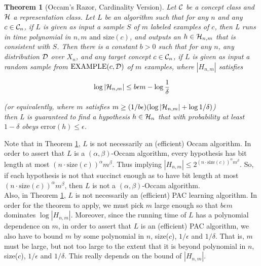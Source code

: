 \documentclass[12pt]{article}
\newtheorem{theorem}{Theorem}
\newcommand{\calc}{{\cal C}}
\newcommand{\cald}{{\cal D}}
\newcommand{\calh}{{\cal H}}
\begin{document}
\begin{theorem} [Occam's Razor, Cardinality Version] \label{theorem:occ-cad}
Let $\calc$ be a concept class and $\calh$ a representation class. Let $L$ be an algorithm such that for any $n$ and any $c \in \calc_n$, if $L$ is given as input a sample $S$ of $m$ labeled examples of $c$, then L runs in time polynomial in $n, m \text{ and size}(c)$, and outputs an $h \in \calh_{n,m}$ that is consistent with $S$. Then there is a constant $b > 0$ such that for any $n$, any distribution $\cald$ over $X_n$, and any target concept $c \in \calc_n$, if $L$ is given as input a random sample from $\text{EXAMPLE}(c, \cald)$ of $m$ examples, where $|H_{n,m}|$ satisfies

\begin{equation*}
\log {|\calh_{n,m}|} \le b \epsilon m - \log {\frac {1}{\delta}}
\end{equation*}

(or equivalently, where $m$ satisfies $m \ge (1 / {b \epsilon}) (\log {|\calh_{n,m}| + \log {1 / \delta}})$) \\
then L is guaranteed to find a hypothesis $h \in \calh_n$ that with probability at least $1 - \delta$ obeys $\text {error}(h) \le \epsilon$.
\end{theorem}

Note that in Theorem \ref{theorem:occ-cad}, $L$ is not necessarily an (efficient) Occam algorithm. In order to assert that $L$ is a $(\alpha, \beta)$-Occam algorithm, every hypothesis has bit length at most $(n \cdot \text {size}(c))^{\alpha}m^{\beta}$. Thus implying $|H_{n,m}| \le 2^{(n \cdot \text {size}(c))^{\alpha}m^{\beta}}$. So, if each hypothesis is not that succinct enough as to have bit length at most $(n \cdot \text {size}(c))^{\alpha}m^{\beta}$, then $L$ is not a $(\alpha, \beta)$-Occam algorithm. \\

Also, in Theorem \ref{theorem:occ-cad}, $L$ is not necessarily an (efficient) PAC learning algorithm. In order for the theorem to apply, we must pick $m$ large enough so that $b \epsilon m$ dominates $\log {|H_{n,m}|}$. Moreover, since the running time of $L$ has a polynomial dependence on $m$, in order to assert that $L$ is an (efficient) PAC algorithm, we also have to bound $m$ by some polynomial in $n$, size($c$), $1 / \epsilon$ and $1 / \delta$. That is, $m$ must be large, but not too large to the extent that it is beyond polynomial in $n$, size($c$), $1 / \epsilon$ and $1 / \delta$. This really depends on the bound of $|H_{n,m}|$. \\
\end{document}
